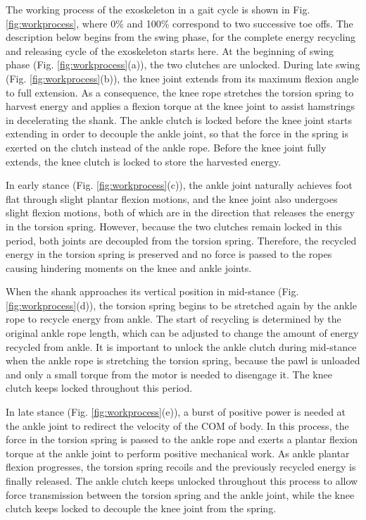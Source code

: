 \documentclass[twocolumn,cleanfoot,10pt]{asme2ej}
\begin{document}
The working process of the exoskeleton in a gait cycle is shown in Fig. \ref{fig:workprocess}, where 0\% and 100\% correspond to two successive toe offs.
The description below begins from the swing phase, for the complete energy recycling and releasing cycle of the exoskeleton starts here.
At the beginning of swing phase (Fig. \ref{fig:workprocess}(a)), the two clutches are unlocked.
During late swing (Fig. \ref{fig:workprocess}(b)), the knee joint extends from its maximum flexion angle to full extension.
As a consequence, the knee rope stretches the torsion spring to harvest energy and applies a flexion torque at the knee joint to assist hamstrings in decelerating the shank.
The ankle clutch is locked before the knee joint starts extending in order to decouple the ankle joint, so that the force in the spring is exerted on the clutch instead of the ankle rope.
Before the knee joint fully extends, the knee clutch is locked to store the harvested energy.

In early stance (Fig. \ref{fig:workprocess}(c)), the ankle joint naturally achieves foot flat through slight plantar flexion motions, and the knee joint also undergoes slight flexion motions, both of which are in the direction that releases the energy in the torsion spring.
However, because the two clutches remain locked in this period, both joints are decoupled from the torsion spring.
Therefore, the recycled energy in the torsion spring is preserved and no force is passed to the ropes causing hindering moments on the knee and ankle joints.

When the shank approaches its vertical position in mid-stance (Fig. \ref{fig:workprocess}(d)), the torsion spring begins to be stretched again by the ankle rope to recycle energy from ankle.
The start of recycling is determined by the original ankle rope length, which can be adjusted to change the amount of energy recycled from ankle.
It is important to unlock the ankle clutch during mid-stance when the ankle rope is stretching the torsion spring, because the pawl is unloaded and only a small torque from the motor is needed to disengage it.
The knee clutch keeps locked throughout this period.

In late stance (Fig. \ref{fig:workprocess}(e)), a burst of positive power is needed at the ankle joint to redirect the velocity of the COM of body.
In this process, the force in the torsion spring is passed to the ankle rope and exerts a plantar flexion torque at the ankle joint to perform positive mechanical work.
As ankle plantar flexion progresses, the torsion spring recoils and the previously recycled energy is finally released.
The ankle clutch keeps unlocked throughout this process to allow force transmission between the torsion spring and the ankle joint, while the knee clutch keeps locked to decouple the knee joint from the spring.
\end{document}

